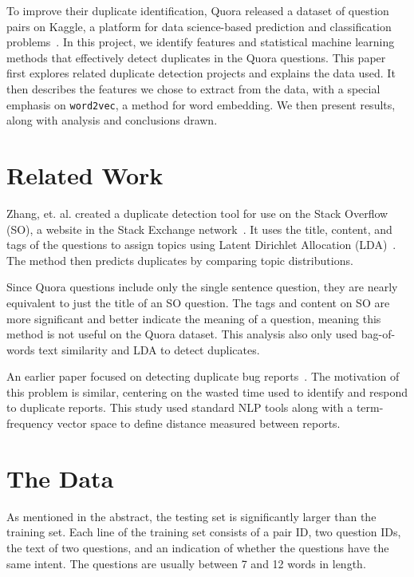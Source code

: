 \documentclass{article} %
\newcommand{\wordtvec}{\texttt{word2vec}}
\begin{document}
To improve their duplicate identification, Quora released a dataset of question pairs on Kaggle, a platform for data science-based prediction and classification problems~\cite{kaggleComp}. In this project, we identify features and statistical machine learning methods that effectively detect duplicates in the Quora questions. This paper first explores related duplicate detection projects and explains the data used. It then describes the features we chose to extract from the data, with a special emphasis on \wordtvec, a method for word embedding. We then present results, along with analysis and conclusions drawn. 



\section{Related Work}

Zhang, et. al. created a duplicate detection tool for use on the Stack Overflow (SO), a website in the Stack Exchange network~\cite{Zhang2015}. It uses the title, content, and tags of the questions to assign topics using Latent Dirichlet Allocation (LDA)~\cite{Blei03}. The method then predicts duplicates by comparing topic distributions.

Since Quora questions include only the single sentence question, they are nearly equivalent to just the title of an SO question. The tags and content on SO are more significant and better indicate the meaning of a question, meaning this method is not useful on the Quora dataset. This analysis also only used bag-of-words text similarity and LDA to detect duplicates.

An earlier paper focused on detecting duplicate bug reports~\cite{Runeson2007}. The motivation of this problem is similar, centering on the wasted time used to identify and respond to duplicate reports. This study used standard NLP tools along with a term-frequency vector space to define distance measured between reports. 



\section{The Data}

As mentioned in the abstract, the testing set is significantly larger than the training set. Each line of the training set consists of a pair ID, two question IDs, the text of two questions, and an indication of whether the questions have the same intent. The questions are usually between 7 and 12 words in length.
\end{document}
